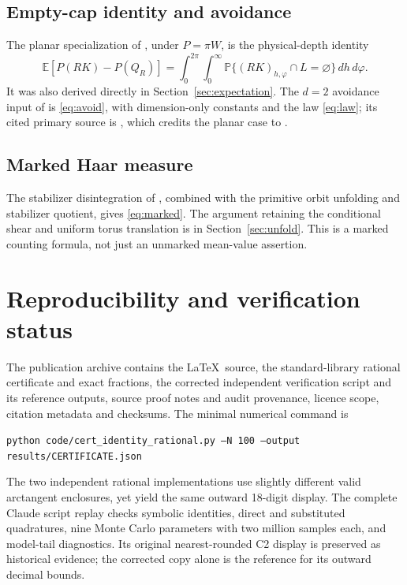 \documentclass[11pt,a4paper]{article}
\newcommand{\E}{\mathbb E}\newcommand{\Prob}{\mathbb P}
\theoremstyle{remark}\newtheorem{remark}{Remark}
\numberwithin{equation}{section}
\begin{document}
\subsection{Empty-cap identity and avoidance}
The planar specialization of \cite[Lemma~3.1]{NR}, under $P=\pi W$, is the physical-depth identity
\[
 \E[P(RK)-P(Q_R)]
 =\int_0^{2\pi}\int_0^\infty
 \Prob\{(RK)_{h,\varphi}\cap L=\varnothing\}\,dh\,d\varphi.
\]
It was also derived directly in Section~\ref{sec:expectation}. The $d=2$ avoidance input of \cite[Lemma~3.2]{NR} is \eqref{eq:avoid}, with dimension-only constants and the law \eqref{eq:law}; its cited primary source is \cite[Theorem~1.1]{B}, which credits the planar case to \cite{BM}.

\subsection{Marked Haar measure}
The stabilizer disintegration of \cite[Lemma~7.4, (7.17)]{MS}, combined with the primitive orbit unfolding and stabilizer quotient, gives \eqref{eq:marked}. The argument retaining the conditional shear and uniform torus translation is in Section~\ref{sec:unfold}. This is a marked counting formula, not just an unmarked mean-value assertion.

\section{Reproducibility and verification status}
The publication archive contains the \LaTeX\ source, the standard-library rational certificate and exact fractions, the corrected independent verification script and its reference outputs, source proof notes and audit provenance, licence scope, citation metadata and checksums. The minimal numerical command is
\begin{center}\small\texttt{python code/cert\_identity\_rational.py --N 100 --output results/CERTIFICATE.json}\end{center}
The two independent rational implementations use slightly different valid arctangent enclosures, yet yield the same outward 18-digit display. The complete Claude script replay checks symbolic identities, direct and substituted quadratures, nine Monte Carlo parameters with two million samples each, and model-tail diagnostics. Its original nearest-rounded C2 display is preserved as historical evidence; the corrected copy alone is the reference for its outward decimal bounds.
\end{document}
